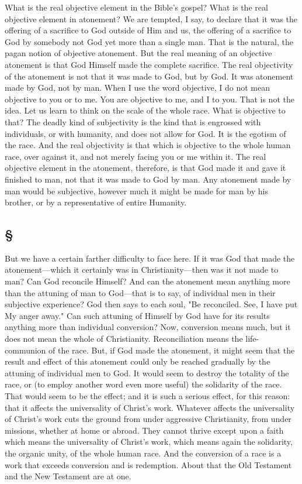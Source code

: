 \documentclass[draft]{ptfdoc}
\begin{document}
What is the real objective element in the 
Bible's gospel? What is the real objective 
element in atonement? We are tempted, I say, 
to declare that it was the offering of a sacrifice 
to God outside of Him and us, the offering of a 
sacrifice to God by somebody not God yet more 
than a single man. That is the natural, the 
pagan notion of objective atonement. But the 
real meaning of an objective atonement is that 
God Himself made the complete sacrifice. The 
real objectivity of the atonement is not that it 
was made to God, but by God. It was atonement 
made by God, not by man. When I use the 
word objective, I do not mean objective to you or 
to me. You are objective to me, and I to you. 
That is not the idea. Let us learn to think on 
the scale of the whole race. What is objective 
to that? The deadly kind of subjectivity is 
the kind that is engrossed with individuals, 
or with humanity, and does not allow for God. 
It is the egotism of the race. And the real objectivity 
is that which is objective to the whole 
human race, over against it, and not merely 
facing you or me within it. The real objective 
element in the atonement, therefore, is that God 
made it and gave it finished to man, not that 
it was made to God by man. Any atonement 
made by man would be subjective, however 
much it might be made for man by his brother, 
or by a representative of entire Humanity. 

\subsection*{
\S
}
  
But we have a certain farther difficulty to 
face here. If it was God that made the atonement---which 
it certainly was in Christianity---then 
was it not made to man? Can God reconcile 
Himself? And can the atonement mean 
anything more than the attuning of man to 
God---that is to say, of individual men in their 
subjective experience? God then says to each 
soul, "Be reconciled. See, I have put My anger 
away." Can such attuning of Himself by God 
have for its results anything more than individual 
conversion? Now, conversion means 
much, but it does not mean the whole of 
Christianity. Reconciliation means the life-communion 
of the race. But, if God made the 
atonement, it might seem that the result and 
effect of this atonement could only be reached 
gradually by the attuning of individual men to 
God. It would seem to destroy the totality of 
the race, or (to employ another word even 
more useful) the solidarity of the race. That 
would seem to be the effect; and it is such a 
serious effect, for this reason: that it affects 
the universality of Christ's work. Whatever 
affects the universality of Christ's work cuts 
the ground from under aggressive Christianity, 
from under missions, whether at home or 
abroad. They cannot thrive except upon a 
faith which means the universality of Christ's 
work, which means again the solidarity, the 
organic unity, of the whole human race. And 
the conversion of a race is a work that exceeds 
conversion and is redemption. About that the 
Old Testament and the New Testament are 
at one. 
\end{document}
